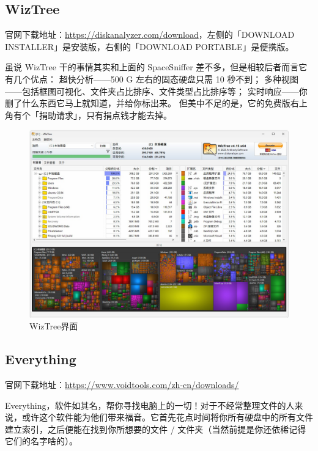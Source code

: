 \subsection{WizTree}

官网下载地址：\url{https://diskanalyzer.com/download}，左侧的「DOWNLOAD INSTALLER」是安装版，右侧的「DOWNLOAD PORTABLE」是便携版。

虽说 WizTree 干的事情其实和上面的 SpaceSniffer 差不多，但是相较后者而言它有几个优点：
超快分析——500 G 左右的固态硬盘只需 10 秒不到；
多种视图——包括框图可视化、文件夹占比排序、文件类型占比排序等；
实时响应——你删了什么东西它马上就知道，并给你标出来。
但美中不足的是，它的免费版右上角有个「捐助请求」，只有捐点钱才能去掉。

\begin{figure}[htb!]
  \centering
  \includegraphics[width=.8\textwidth]{assets/WizTree.jpg}
  \caption{WizTree界面}
  \label{WizTree}
\end{figure}

\subsection{Everything}

官网下载地址：\url{https://www.voidtools.com/zh-cn/downloads/}

Everything，软件如其名，帮你寻找电脑上的一切！对于不经常整理文件的人来说，或许这个软件能为他们带来福音。它首先花点时间将你所有硬盘中的所有文件建立索引，之后便能在找到你所想要的文件 / 文件夹（当然前提是你还依稀记得它们的名字啥的）。

